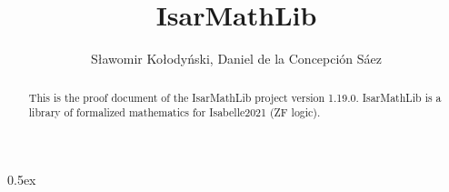 \documentclass[11pt,a4paper]{article}
\begin{document}
\title{IsarMathLib}
\author{S\l awomir Ko\l ody\'{n}ski, Daniel de la Concepci\'{o}n S\'{a}ez}
\maketitle

\begin{abstract}
This is the proof document of the IsarMathLib project version 1.19.0. 
IsarMathLib is a library of formalized mathematics for Isabelle2021 (ZF logic). 
 
\end{abstract}

\tableofcontents

\parindent 0pt\parskip 0.5ex





\end{document}
